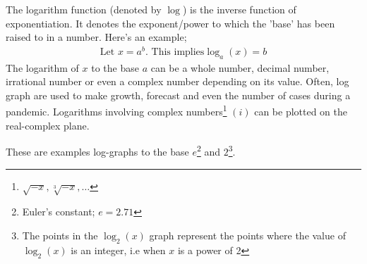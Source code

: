 \begin{mathbox}{}
{The {logarithm} function (denoted by $\log$) is the {inverse} function of {exponentiation}. It denotes the {exponent/power} to which the {'base'} has been raised to in a number. Here's an example;
\begin{align*}
    \text{Let } x = a^b. \text{ This implies} \log_a (x) = b
\end{align*}
The logarithm of $x$ to the base $a$ can be a {whole number, decimal number, irrational number} or even a {complex number} depending on its value. Often, log graph are used to make growth, forecast and even the number of cases during a pandemic. Logarithms involving complex numbers\footnote{\sffamily${\sqrt{-x}, \sqrt[3]{-x}, \dots}$} $(i)$ can be plotted on the real-complex plane.
\begin{flushleft}
\end{flushleft}
\begin{flushleft}
\end{flushleft}
These are examples log-graphs to the base $e$\footnote{Euler's constant; $e = 2.71$} and $2$\footnote{The points in the $\log_2(x)$ graph represent the points where the value of $\log_2(x)$ is an integer, i.e when $x$ is a power of 2}.}
\end{mathbox}

